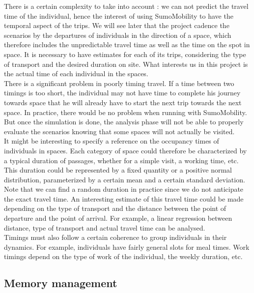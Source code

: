 There is a certain complexity to take into account : we can not predict the travel time of the individual, hence the interest of using SumoMobility to have the temporal aspect of the trips. We will see later that the project cadence the scenarios by the departures of individuals in the direction of a space, which therefore includes the unpredictable travel time as well as the time on the spot in space. It is necessary to have estimates for each of its trips, considering the type of transport and the desired duration on site. What interests us in this project is the actual time of each individual in the spaces.\\

There is a significant problem in poorly timing travel. If a time between two timings is too short, the individual may not have time to complete his journey towards space that he will already have to start the next trip towards the next space. In practice, there would be no problem when running with SumoMobility. But once the simulation is done, the analysis phase will not be able to properly evaluate the scenarios knowing that some spaces will not actually be visited.\\

It might be interesting to specify a reference on the occupancy times of individuals in spaces. Each category of space could therefore be characterized by a typical duration of passages, whether for a simple visit, a working time, etc. This duration could be represented by a fixed quantity or a positive normal distribution, parameterized by a certain mean and a certain standard deviation. Note that we can find a random duration in practice since we do not anticipate the exact travel time. An interesting estimate of this travel time could be made depending on the type of transport and the distance between the point of departure and the point of arrival. For example, a linear regression between distance, type of transport and actual travel time can be analysed.\\

Timings must also follow a certain coherence to group individuals in their dynamics. For example, individuals have fairly general slots for meal times. Work timings depend on the type of work of the individual, the weekly duration, etc.\\

\subsection{Memory management}

